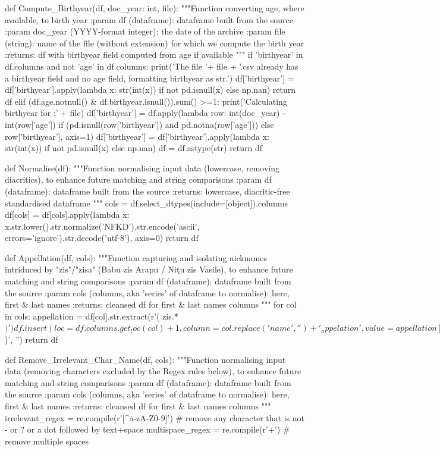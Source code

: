\documentclass[a4paper,12pt,twoside]{book}
\begin{document}
\begin{python}
def Compute_Birthyear(df, doc_year: int, file):
  """Function converting age, where available, to birth year
  :param df (dataframe): dataframe built from the source
  :param doc_year (YYYY-format integer): the date of the archive
  :param file (string): name of the file (without extension) for which we compute the birth year
  :returns: df with birthyear field computed from age if available
  """
  if 'birthyear' in df.columns and not 'age' in df.columns:
    print('The file '+ file + '.csv already has a birthyear field and no age field, formatting birthyear as str.')
    df['birthyear'] = df['birthyear'].apply(lambda x: str(int(x)) if not pd.isnull(x) else np.nan)
    return df
  elif (df.age.notnull() & df.birthyear.isnull()).sum() >=1:
    print('Calculating birthyear for :' + file)
    df['birthyear'] = df.apply(lambda row: int(doc_year) - int(row['age']) if (pd.isnull(row['birthyear']) and pd.notna(row['age'])) else row['birthyear'], axis=1)
    df['birthyear'] = df['birthyear'].apply(lambda x: str(int(x)) if not pd.isnull(x) else np.nan)
    df = df.astype(str)
  return df

def Normalise(df):
  """Function normalising input data (lowercase, removing diacritics), to enhance future matching and string comparisons
    :param df (dataframe): dataframe built from the source
    :returns: lowercase, diacritic-free standardised dataframe
  """
  cols = df.select_dtypes(include=[object]).columns
  df[cols] = df[cols].apply(lambda x: x.str.lower().str.normalize('NFKD').str.encode('ascii', errors='ignore').str.decode('utf-8'), axis=0)
  return df

def Appellation(df, cols):
  """Function capturing and isolating nicknames intriduced by "zis"/"zisa" (Babu zis Arapu / Niţu zis Vasile), to enhance future matching and string comparisons
    :param df (dataframe): dataframe built from the source
    :param cols (columns, aka 'series' of dataframe to normalise): here, first & last names
    :returns: cleansed df for first & last names columns
  """
  for col in cols:
    appellation = df[col].str.extract(r'( zis.*$)')
    df.insert(loc = df.columns.get_loc(col) + 1 , column = col.replace('name','') + '_appelation', value = appellation[0])
    df[col] = df[col].str.replace(r'( zis.*$)', '')
  return df

def Remove_Irrelevant_Char_Name(df, cols):
  """Function normalising input data (removing characters excluded by the Regex rules below), to enhance future matching and string comparisons
    :param df (dataframe): dataframe built from the source
    :param cols (columns, aka 'series' of dataframe to normalise): here, first & last names
    :returns: cleansed df for first & last names columns
  """
  irrelevant_regex = re.compile(r'[^\-\?\.a-zA-Z0-9\s]') # remove any character that is not - or ? or a dot followed by text+space
  multispace_regex = re.compile(r'\s\s+') # remove multiple spaces
  

\end{python}
\end{document}
